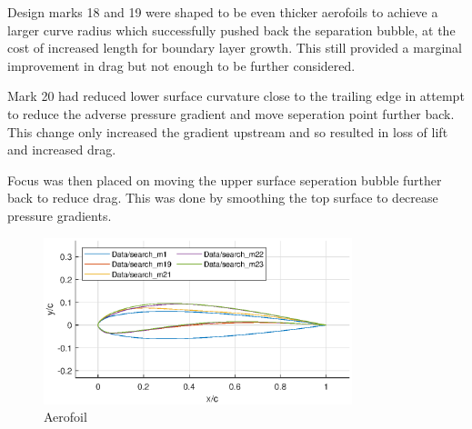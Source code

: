 \documentclass{article}
\begin{document}
Design marks 18 and 19 were shaped to be even thicker aerofoils to achieve a larger curve radius which successfully pushed back the separation bubble, at the cost of increased length for boundary layer growth.
This still provided a marginal improvement in drag but not enough to be further considered.

Mark 20 had reduced lower surface curvature close to the trailing edge in attempt to reduce the adverse pressure gradient and move seperation point further back.
This change only increased the gradient upstream and so resulted in loss of lift and increased drag.

Focus was then placed on moving the upper surface seperation bubble further back to reduce drag.
This was done by smoothing the top surface to decrease pressure gradients.


\begin{figure}[H]
    \centering
    \includegraphics[width=0.8\textwidth]{figures/loRe_geometry_23.eps}
    \caption{Aerofoil}
    \label{fig:m23_geometry}
\end{figure}
\end{document}
